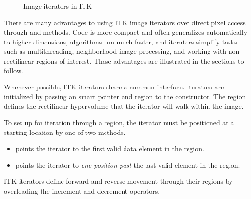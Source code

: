 \begin{figure}
\centering
\caption[Image iterators in ITK]{Image iterators in ITK}
\protect\label{fig:ImageIterators}
\end{figure}

There are many advantages to using ITK image iterators over direct pixel access
through  and  methods.  Code is
more compact and often generalizes automatically to higher dimensions,
algorithms run much faster, and iterators simplify tasks such as
multithreading, neighborhood image processing, and working with non-rectilinear
regions of interest.  These advantages are illustrated in the sections to
follow.


Whenever possible, ITK iterators share a common interface.  Iterators are
initialized by passing an  smart pointer and region to the
constructor.  The region defines the rectilinear hypervolume that the iterator
will walk within the image.  

To set up for iteration through a region, the iterator must be positioned at a
starting location by one of two methods.

\begin{itemize}
\item \textbf{} points the iterator to the first valid
data element in the region.

\item \textbf{} points the iterator to \emph{one position past}
the last valid element in the region.
\end{itemize}

ITK iterators define forward and reverse movement through their regions by
overloading the increment and decrement operators.

